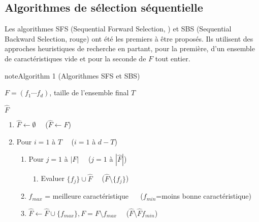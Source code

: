 \documentclass[letterpaper,10pt,french]{sphinxmanual}
\begin{document}
\subsection{Algorithmes de sélection séquentielle}
\label{\detokenize{selection:algorithmes-de-selection-sequentielle}}
\sphinxAtStartPar
Les algorithmes SFS (Sequential Forward Selection, {\hyperref[\detokenize{selection:SFS}]{}}) et SBS (Sequential Backward Selection, {\hyperref[\detokenize{selection:SFS}]{}}\sphinxhyphen{}rouge) ont été les premiers à être proposés. Ils utilisent des approches heuristiques de recherche en partant, pour la première, d’un ensemble de caractéristiques vide et pour la seconde de  \(F\) tout entier.
\label{selection:SFS}
\begin{sphinxadmonition}{note}{Algorithm 1 (Algorithmes SFS et SBS)}



\sphinxAtStartPar
{} \(F = \left (f_1\cdots f_d\right )\), taille de l’ensemble final  \(T\)

\sphinxAtStartPar
{} \(\hat{F}\)
\begin{enumerate}
%
\item {} 
\sphinxAtStartPar
\(\hat{F}\leftarrow \emptyset\quad\) (\(\hat{F}\leftarrow F\))

\item {} 
\sphinxAtStartPar
Pour \(i=1\) à \( T\quad\) (\(i=1\) à \(d-T\))
\begin{enumerate}
%
\item {} 
\sphinxAtStartPar
Pour \(j=1\) à \( |{F}|\quad\) (\(j=1\) à \(|\hat{F}|\))
\begin{enumerate}
%
\item {} 
\sphinxAtStartPar
Evaluer \(\{f_j\}\cup \hat{F}\quad\) (\(\hat{F}\setminus \{f_j\}\))

\end{enumerate}

\item {} 
\sphinxAtStartPar
\(f_{max}\) = meilleure caractéristique \(\quad\) (\(f_{min}\)=moins bonne caractéristique)

\item {} 
\sphinxAtStartPar
\(\hat{F}\leftarrow\hat{F}\cup\{f_{max}\}, F=F\setminus f_{max}\quad\) (\(\hat{F}\setminus\hat{F}f_{min}\))

\end{enumerate}

\end{enumerate}
\end{sphinxadmonition}
\end{document}
